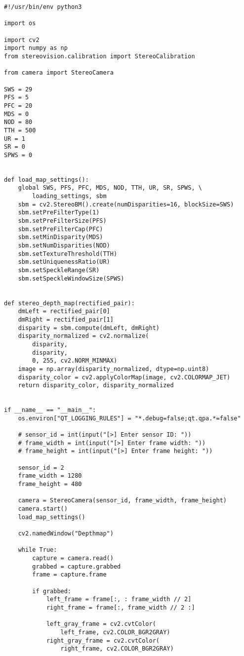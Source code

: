 \begin{verbatim}
#!/usr/bin/env python3

import os

import cv2
import numpy as np
from stereovision.calibration import StereoCalibration

from camera import StereoCamera

SWS = 29
PFS = 5
PFC = 20
MDS = 0
NOD = 80
TTH = 500
UR = 1
SR = 0
SPWS = 0


def load_map_settings():
    global SWS, PFS, PFC, MDS, NOD, TTH, UR, SR, SPWS, \
        loading_settings, sbm
    sbm = cv2.StereoBM().create(numDisparities=16, blockSize=SWS)
    sbm.setPreFilterType(1)
    sbm.setPreFilterSize(PFS)
    sbm.setPreFilterCap(PFC)
    sbm.setMinDisparity(MDS)
    sbm.setNumDisparities(NOD)
    sbm.setTextureThreshold(TTH)
    sbm.setUniquenessRatio(UR)
    sbm.setSpeckleRange(SR)
    sbm.setSpeckleWindowSize(SPWS)


def stereo_depth_map(rectified_pair):
    dmLeft = rectified_pair[0]
    dmRight = rectified_pair[1]
    disparity = sbm.compute(dmLeft, dmRight)
    disparity_normalized = cv2.normalize(
        disparity,
        disparity,
        0, 255, cv2.NORM_MINMAX)
    image = np.array(disparity_normalized, dtype=np.uint8)
    disparity_color = cv2.applyColorMap(image, cv2.COLORMAP_JET)
    return disparity_color, disparity_normalized


if __name__ == "__main__":
    os.environ["QT_LOGGING_RULES"] = "*.debug=false;qt.qpa.*=false"

    # sensor_id = int(input("[>] Enter sensor ID: "))
    # frame_width = int(input("[>] Enter frame width: "))
    # frame_height = int(input("[>] Enter frame height: "))

    sensor_id = 2
    frame_width = 1280
    frame_height = 480

    camera = StereoCamera(sensor_id, frame_width, frame_height)
    camera.start()
    load_map_settings()

    cv2.namedWindow("Depthmap")

    while True:
        capture = camera.read()
        grabbed = capture.grabbed
        frame = capture.frame

        if grabbed:
            left_frame = frame[:, : frame_width // 2]
            right_frame = frame[:, frame_width // 2 :]

            left_gray_frame = cv2.cvtColor(
                left_frame, cv2.COLOR_BGR2GRAY)
            right_gray_frame = cv2.cvtColor(
                right_frame, cv2.COLOR_BGR2GRAY)


\end{verbatim}
